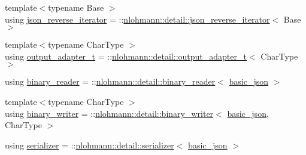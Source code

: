 \begin{DoxyCompactItemize}
\item 
{\footnotesize template$<$typename Base $>$ }\\using \hyperlink{classnlohmann_1_1basic__json_a8d18136ac63e52780e9d7441981a2db4}{json\+\_\+reverse\+\_\+iterator} = \+::\hyperlink{classnlohmann_1_1detail_1_1json__reverse__iterator}{nlohmann\+::detail\+::json\+\_\+reverse\+\_\+iterator}$<$ Base $>$
\item 
{\footnotesize template$<$typename Char\+Type $>$ }\\using \hyperlink{classnlohmann_1_1basic__json_a5f17a041e3338ea006eaac2d89446c0d}{output\+\_\+adapter\+\_\+t} = \+::\hyperlink{namespacenlohmann_1_1detail_a9b680ddfb58f27eb53a67229447fc556}{nlohmann\+::detail\+::output\+\_\+adapter\+\_\+t}$<$ Char\+Type $>$
\item 
using \hyperlink{classnlohmann_1_1basic__json_a7e06ed27ff517575ccb23fc23fca2b8f}{binary\+\_\+reader} = \+::\hyperlink{classnlohmann_1_1detail_1_1binary__reader}{nlohmann\+::detail\+::binary\+\_\+reader}$<$ \hyperlink{classnlohmann_1_1basic__json}{basic\+\_\+json} $>$
\item 
{\footnotesize template$<$typename Char\+Type $>$ }\\using \hyperlink{classnlohmann_1_1basic__json_af32e8be561b513f946e3ca511e968d58}{binary\+\_\+writer} = \+::\hyperlink{classnlohmann_1_1detail_1_1binary__writer}{nlohmann\+::detail\+::binary\+\_\+writer}$<$ \hyperlink{classnlohmann_1_1basic__json}{basic\+\_\+json}, Char\+Type $>$
\item 
using \hyperlink{classnlohmann_1_1basic__json_a68557c31b3bdf31c12e148baecec0d23}{serializer} = \+::\hyperlink{classnlohmann_1_1detail_1_1serializer}{nlohmann\+::detail\+::serializer}$<$ \hyperlink{classnlohmann_1_1basic__json}{basic\+\_\+json} $>$
\end{DoxyCompactItemize}
